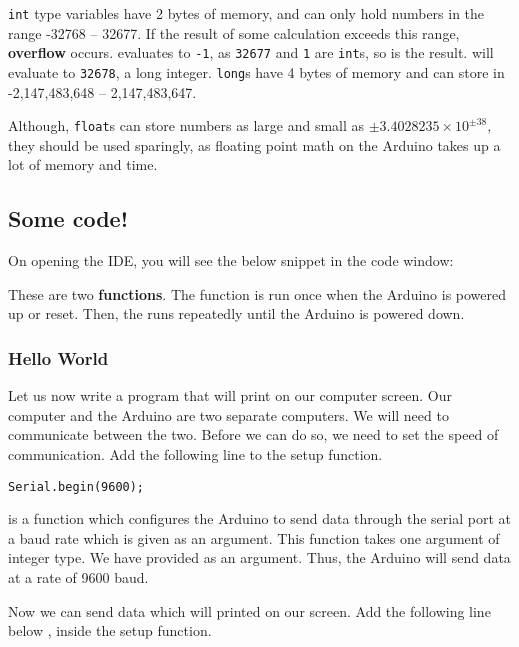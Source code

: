 \documentclass{article}
\begin{document}
			\texttt{int} type variables have 2 bytes of memory, and can only hold numbers in the range -32768 -- 32677. If the result of some calculation exceeds this range, \textbf{overflow} occurs.  evaluates to \texttt{-1}, as \texttt{32677} and \texttt{1} are \texttt{int}s, so is the result.  will evaluate to \texttt{32678}, a long integer. \texttt{long}s have 4 bytes of memory and can store in -2,147,483,648 -- 2,147,483,647.

			Although, \texttt{float}s can store numbers as large and small as $\pm3.4028235\times10^{\pm38}$, they should be used sparingly, as floating point math on the Arduino takes up a lot of memory and time.


	\subsection{Some code!}

		On opening the IDE, you will see the below snippet in the code window:

		

		These are two \textbf{functions}. The  function is run once when the Arduino is powered up or reset. Then, the  runs repeatedly until the Arduino is powered down.

		\subsubsection{Hello World}
			Let us now write a program that will print  on our computer screen. Our computer and the Arduino are two separate computers. We will need to communicate between the two. Before we can do so, we need to set the speed of communication. Add the following line to the setup function.

			\begin{lstlisting}[firstnumber = 3]
			Serial.begin(9600);
			\end{lstlisting}

			 is a function which configures the Arduino to send data through the serial port at a baud rate which is given as an argument. This function takes one argument of integer type. We have provided  as an argument. Thus, the Arduino will send data at a rate of 9600 baud.

			Now we can send data which will printed on our screen. Add the following line below , inside the setup function.
\end{document}

